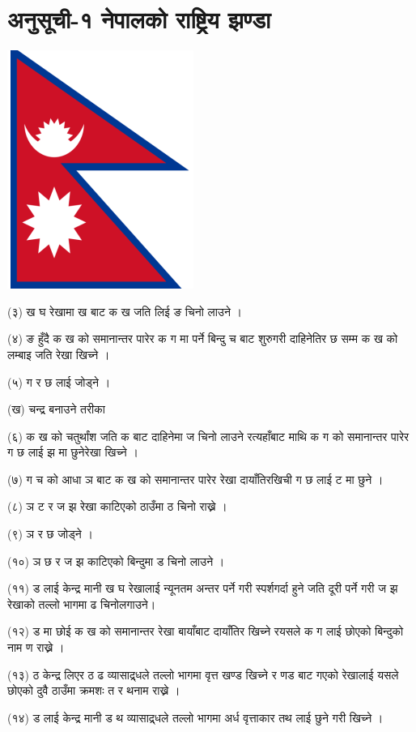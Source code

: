 \section{अनुसूची-१ नेपालको राष्ट्रिय झण्डा}

\includegraphics{images/Nepal-Flag.png}

(३) ख घ रेखामा ख बाट क ख जति लिई ङ चिनो लाउने ।

(४) ङ हुँदै क ख को समानान्तर पारेर क ग मा पर्ने बिन्दु च बाट शुरुगरी दाहिनेतिर छ सम्म क ख को लम्बाइ जति रेखा खिच्ने ।

(५) ग र छ लाई जोड्ने ।

(ख) चन्द्र बनाउने तरीका

(६) क ख को चतुर्थांश जति क बाट दाहिनेमा ज चिनो लाउने रत्यहाँबाट माथि क ग को समानान्तर पारेर ग छ लाई झ मा छुनेरेखा खिच्ने ।

(७) ग च को आधा ञ बाट क ख को समानान्तर पारेर रेखा दायाँतिरखिची ग छ लाई ट मा छुने ।

(८) ञ ट र ज झ रेखा काटिएको ठाउँमा ठ चिनो राख्ने ।

(९) ञ र छ जोड्ने ।

(१०) ञ छ र ज झ काटिएको बिन्दुमा ड चिनो लाउने ।

(११) ड लाई केन्द्र मानी ख घ रेखालाई न्यूनतम अन्तर पर्ने गरी स्पर्शगर्दा हुने जति दूरी पर्ने गरी ज झ रेखाको तल्लो भागमा ढ चिनोलगाउने।

(१२) ड मा छोई क ख को समानान्तर रेखा बायाँबाट दायाँतिर खिच्ने रयसले क ग लाई छोएको बिन्दुको नाम ण राख्ने ।

(१३) ठ केन्द्र लिएर ठ ढ व्यासाद्र्धले तल्लो भागमा वृत्त खण्ड खिच्ने र णड बाट गएको रेखालाई यसले छोएको दुवै ठाउँमा क्रमशः त र थनाम राख्ने ।

(१४) ड लाई केन्द्र मानी ड थ व्यासाद्र्धले तल्लो भागमा अर्ध वृत्ताकार तथ लाई छुने गरी खिच्ने ।

